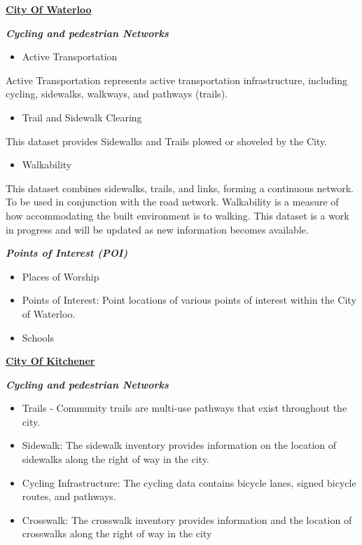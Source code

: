 \documentclass[
11pt, %
oneside, %
english, %
singlespacing, %
]{macthesis} %
\def\tightlist{}
\begin{document}
\textbf{\href{https://data.waterloo.ca/search?tags=base\%20data}{City Of Waterloo}}

\textbf{\emph{Cycling and pedestrian Networks}}

\begin{itemize}
\tightlist
\item
  Active Transportation
\end{itemize}

Active Transportation represents active transportation infrastructure, including cycling, sidewalks, walkways, and pathways (trails).

\begin{itemize}
\tightlist
\item
  Trail and Sidewalk Clearing
\end{itemize}

This dataset provides Sidewalks and Trails plowed or shoveled by the City.

\begin{itemize}
\tightlist
\item
  Walkability
\end{itemize}

This dataset combines sidewalks, trails, and links, forming a continuous network. To be used in conjunction with the road network. Walkability is a measure of how accommodating the built environment is to walking. This dataset is a work in progress and will be updated as new information becomes available.

\textbf{\emph{Points of Interest (POI)}}

\begin{itemize}
\tightlist
\item
  Places of Worship
\item
  Points of Interest: Point locations of various points of interest within the City of Waterloo.
\item
  Schools
\end{itemize}

\textbf{\href{https://data.waterloo.ca/search?tags=base\%20data}{City Of Kitchener}}

\textbf{\emph{Cycling and pedestrian Networks}}

\begin{itemize}
\item
  Trails - Community trails are multi-use pathways that exist throughout the city.
\item
  Sidewalk: The sidewalk inventory provides information on the location of sidewalks along the right of way in the city.
\item
  Cycling Infrastructure: The cycling data contains bicycle lanes, signed bicycle routes, and pathways.
\item
  Crosswalk: The crosswalk inventory provides information and the location of crosswalks along the right of way in the city
\end{itemize}
\end{document}
